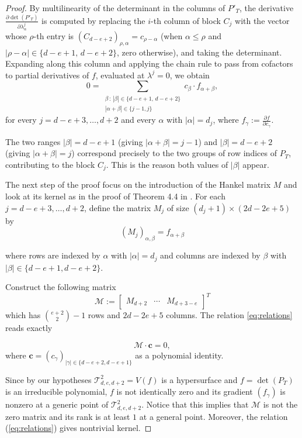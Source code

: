 \documentclass[letterpaper,11pt]{amsart}
\theoremstyle{plain}
\theoremstyle{definition}
\begin{document}
\begin{proof}
By multilinearity of the determinant in the columns of $P'_T$, 
the derivative $\frac{\partial \det(P'_T)}{\partial \lambda^j_\alpha}$ 
is computed by replacing the $i$-th column of block $C_j$ 
with the vector whose $\rho$-th entry is 
$(C_{d-e+2})_{\rho,\alpha} = c_{\rho-\alpha}$ 
(when $\alpha \leq \rho$ and $|\rho-\alpha| \in \{d-e+1,\, d-e+2\}$, 
zero otherwise), and taking the determinant. 
Expanding along this column and applying the chain rule 
to pass from cofactors to partial derivatives of $f$, 
evaluated at $\lambda^j = 0$, we obtain
\begin{equation}\label{eq:relations}
0 = \sum_{\substack{\beta \,:\, |\beta| \in \{d-e+1,\, d-e+2\} \\ 
|\alpha+\beta| \in \{j-1,j\}}} 
c_\beta \cdot f_{\alpha+\beta},
\end{equation} 
\noindent for every $j = d-e+3,\ldots, d+2$ and every $\alpha$ 
with $|\alpha| = d_j$, 
where $f_\gamma := \frac{\partial f}{\partial c_\gamma}$.

The two ranges $|\beta| = d-e+1$ (giving $|\alpha+\beta|=j-1$) 
and $|\beta| = d-e+2$ (giving $|\alpha+\beta| = j$) 
correspond precisely to the two groups of row indices of $P_T$, contributing to the block $C_j$. 
This is the reason both values of $|\beta|$ appear.


The next step of the proof focus on the introduction of the Hankel matrix $M$ and look at its kernel as in the proof of Theorem 4.4 in \cite{TV23}.
For each $j = d-e+3, \ldots, d+2$, 
define the matrix $M_j$ of size $(d_j+1) \times {(2d-2e+5)} $ by 
$$(M_j)_{\alpha,\beta} = f_{\alpha+\beta}$$


\noindent where rows are indexed by $\alpha$ with $|\alpha| = d_j$ 
and columns are indexed by $\beta$ 
with $|\beta| \in \{d-e+1, d-e+2\}$. 

Construct the following matrix
$$
\mathcal{M} := \begin{bmatrix}
M_{d+2} & \cdots & M_{d+3-e}   
\end{bmatrix}^T$$
which has $\binom{e+2}{2}-1$ rows 
and $2d-2e+5$ columns.  
The relation \eqref{eq:relations} reads exactly

$$
\mathcal{M} \cdot \mathbf{c} = 0,
$$
where $\mathbf{c} = (c_\gamma)_{|\gamma| \in \{d-e+2,d-e+1\}}$ as a polynomial identity. 

Since by our hypotheses $\mathcal{T}^2_{d,e,d+2} = V(f)$ is a hypersurface 
and $f = \det(P_T)$ is an irreducible polynomial, 
$f$ is not identically zero and its gradient 
$(f_\gamma)$ is nonzero at a generic point 
of $\mathcal{T}^2_{d,e,d+2}$. Notice that  this implies that $\mathcal M$ is not the zero matrix and its rank is at least $1$ at a general point. Moreover, the relation (\ref{eq:relations}) gives nontrivial kernel.


\end{proof}
\end{document}
